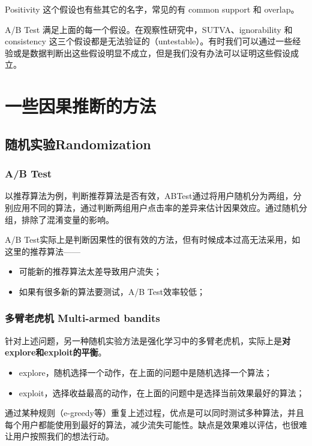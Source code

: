 \documentclass[12pt]{article}
\begin{document}
Positivity 这个假设也有些其它的名字，常见的有 common support 和 overlap。

A/B Test 满足上面的每一个假设。在观察性研究中，SUTVA、ignorability 和 consistency 这三个假设都是无法验证的（untestable）。有时我们可以通过一些经验或是数据判断出这些假设明显不成立，但是我们没有办法可以证明这些假设成立。

\section{一些因果推断的方法}
\subsection{随机实验Randomization}
\subsubsection{A/B Test}
以推荐算法为例，判断推荐算法是否有效，ABTest通过将用户随机分为两组，分别应用不同的算法，通过判断两组用户点击率的差异来估计因果效应。通过随机分组，排除了混淆变量的影响。

A/B Test实际上是判断因果性的很有效的方法，但有时候成本过高无法采用，如这里的推荐算法——
\begin{itemize}
\setlength{\itemsep}{0pt}
\setlength{\parsep}{0pt}
\setlength{\parskip}{0pt}
    \item 可能新的推荐算法太差导致用户流失；
    \item 如果有很多新的算法要测试，A/B Test效率较低；
\end{itemize}

\subsubsection{多臂老虎机 Multi-armed bandits}
针对上述问题，另一种随机实验方法是强化学习中的多臂老虎机，实际上是\textbf{对explore和exploit的平衡}。
\begin{itemize}
\setlength{\itemsep}{0pt}
\setlength{\parsep}{0pt}
\setlength{\parskip}{0pt}
    \item explore，随机选择一个动作，在上面的问题中是随机选择一个算法；
    \item exploit，选择收益最高的动作，在上面的问题中是选择当前效果最好的算法；
\end{itemize}

通过某种规则（e-greedy等）重复上述过程，优点是可以同时测试多种算法，并且每个用户都能使用到最好的算法，减少流失可能性。缺点是效果难以评估，也很难让用户按照我们的想法行动。
\end{document}

